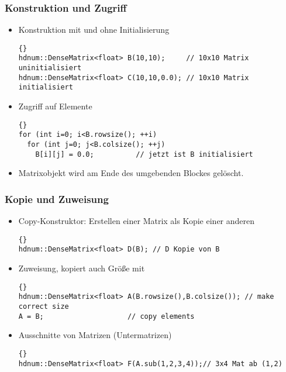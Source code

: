 \documentclass[a4paper,11pt]{article}
\theoremstyle{definition}
\begin{document}
\begin{frame}[fragile]
\frametitle{Konstruktion und Zugriff}
\begin{itemize}
\item Konstruktion mit und ohne Initialisierung\\
{\footnotesize{\begin{lstlisting}{}
hdnum::DenseMatrix<float> B(10,10);     // 10x10 Matrix uninitialisiert
hdnum::DenseMatrix<float> C(10,10,0.0); // 10x10 Matrix initialisiert
\end{lstlisting}}}
\item Zugriff auf Elemente\\
{\footnotesize{\begin{lstlisting}{}
for (int i=0; i<B.rowsize(); ++i)
  for (int j=0; j<B.colsize(); ++j)
    B[i][j] = 0.0;          // jetzt ist B initialisiert
\end{lstlisting}}}
\item Matrixobjekt wird am Ende des umgebenden Blockes gelöscht.
\end{itemize}
\end{frame}

\begin{frame}[fragile]
\frametitle{Kopie und Zuweisung}
\begin{itemize}
\item Copy-Konstruktor: Erstellen einer Matrix als Kopie einer anderen
{\footnotesize{\begin{lstlisting}{}
hdnum::DenseMatrix<float> D(B); // D Kopie von B
\end{lstlisting}}}
\item Zuweisung, kopiert auch Größe mit
{\footnotesize{\begin{lstlisting}{}
hdnum::DenseMatrix<float> A(B.rowsize(),B.colsize()); // make correct size
A = B;                    // copy elements
\end{lstlisting}}}
\item Ausschnitte von Matrizen (Untermatrizen)\\
{\footnotesize{\begin{lstlisting}{}
hdnum::DenseMatrix<float> F(A.sub(1,2,3,4));// 3x4 Mat ab (1,2)
\end{lstlisting}}}
\end{itemize}
\end{frame}
\end{document}
